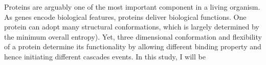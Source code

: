 Proteins are arguably one of the most important component in a living organism. As genes encode biological features, proteins deliver biological functions. One protein can adopt many structural conformations, which is largely determined by the minimum overall entropy). Yet, three dimensional conformation and flexibility of a protein determine its functionality by allowing different binding property and hence initiating different cascades events. In this study, I will be 